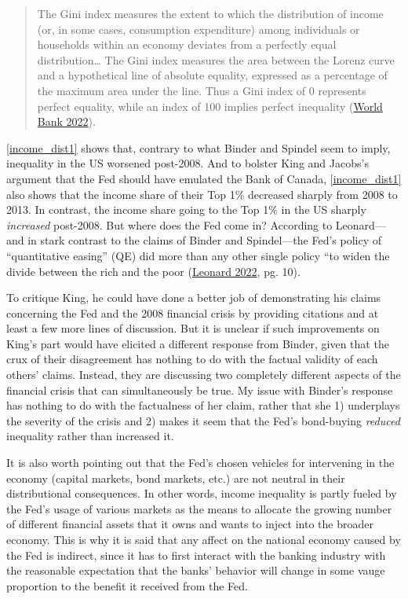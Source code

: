 \documentclass[
  11pt,
]{article}
\begin{document}
\begin{quote}
The Gini index measures the extent to which the distribution of income
(or, in some cases, consumption expenditure) among individuals or
households within an economy deviates from a perfectly equal
distribution\ldots{} The Gini index measures the area between the Lorenz
curve and a hypothetical line of absolute equality, expressed as a
percentage of the maximum area under the line. Thus a Gini index of 0
represents perfect equality, while an index of 100 implies perfect
inequality (\protect\hyperlink{ref-worldbank2022}{World Bank 2022}).
\end{quote}

\autoref{income_dist1} shows that, contrary to what Binder and Spindel
seem to imply, inequality in the US worsened post-2008. And to bolster
King and Jacobs's argument that the Fed should have emulated the Bank of
Canada, \autoref{income_dist1} also shows that the income share of their
Top 1\% decreased sharply from 2008 to 2013. In contrast, the income
share going to the Top 1\% in the US sharply \emph{increased} post-2008.
But where does the Fed come in? According to Leonard---and in stark
contrast to the claims of Binder and Spindel---the Fed's policy of
``quantitative easing'' (QE) did more than any other single policy ``to
widen the divide between the rich and the poor
(\protect\hyperlink{ref-leonard2022}{Leonard 2022}, pg. 10).

To critique King, he could have done a better job of demonstrating his
claims concerning the Fed and the 2008 financial crisis by providing
citations and at least a few more lines of discussion. But it is unclear
if such improvements on King's part would have elicited a different
response from Binder, given that the crux of their disagreement has
nothing to do with the factual validity of each others' claims. Instead,
they are discussing two completely different aspects of the financial
crisis that can simultaneously be true. My issue with Binder's response
has nothing to do with the factualness of her claim, rather that she 1)
underplays the severity of the crisis and 2) makes it seem that the
Fed's bond-buying \emph{reduced} inequality rather than increased it.

It is also worth pointing out that the Fed's chosen vehicles for
intervening in the economy (capital markets, bond markets, etc.) are not
neutral in their distributional consequences. In other words, income
inequality is partly fueled by the Fed's usage of various markets as the
means to allocate the growing number of different financial assets that
it owns and wants to inject into the broader economy. This is why it is
said that any affect on the national economy caused by the Fed is
indirect, since it has to first interact with the banking industry with
the reasonable expectation that the banks' behavior will change in some
vauge proportion to the benefit it received from the Fed.
\end{document}

